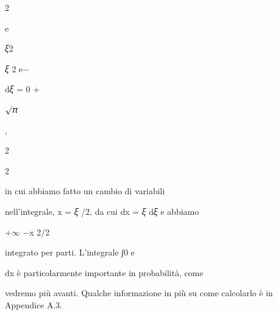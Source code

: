 \documentclass[a4paper,portrait,12pt]{article}
\begin{document}
2





\begin{flushleft}
e
\end{flushleft}





\begin{flushleft}
𝜉2
\end{flushleft}





\begin{flushleft}
𝜉 2 e$-$
\end{flushleft}





\begin{flushleft}
d𝜉 = 0 +
\end{flushleft}





\begin{flushleft}
$\surd$𝜋
\end{flushleft}


,


2





2





\begin{flushleft}
in cui abbiamo fatto un cambio di variabili
\end{flushleft}


\begin{flushleft}
nell'integrale, x = 𝜉 /2, da cui dx = 𝜉 d𝜉 e abbiamo
\end{flushleft}


\begin{flushleft}
+$\infty$ $-$x 2/2
\end{flushleft}


\begin{flushleft}
integrato per parti. L'integrale ∫0 e
\end{flushleft}


\begin{flushleft}
dx \`{e} particolarmente importante in probabilit\`{a}, come
\end{flushleft}


\begin{flushleft}
vedremo più avanti. Qualche informazione in più su come calcolarlo \`{e} in Appendice A.3.
\end{flushleft}
\end{document}
